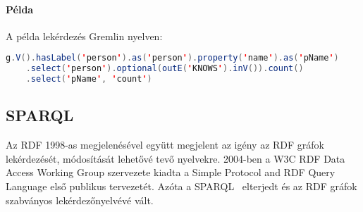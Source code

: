 \paragraph{Példa}

A példa lekérdezés Gremlin nyelven:

\vspace{1.5ex}

\noindent\begin{minipage}{\textwidth}
\begin{lstlisting}[frame=single,language=Java,caption=Gremlin példakód]
g.V().hasLabel('person').as('person').property('name').as('pName')
    .select('person').optional(outE('KNOWS').inV()).count()
    .select('pName', 'count')
\end{lstlisting}
\end{minipage}

\subsection{SPARQL}
Az RDF 1998-as megjelenésével együtt megjelent az igény az RDF gráfok lekérdezését, módosítását lehetővé tevő nyelvekre. 2004-ben a W3C RDF Data Access Working Group szervezete kiadta a Simple Protocol and RDF Query Language első publikus tervezetét. Azóta a SPARQL~\cite{DBLP:journals/tods/PerezAG09} elterjedt és az RDF gráfok szabványos lekérdezőnyelvévé vált.

